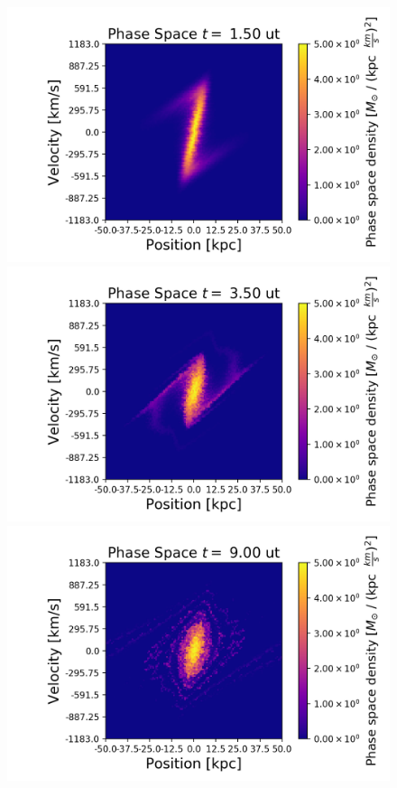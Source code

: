 {\begin{figure}[h!]
    \centering
    \includegraphics[scale=0.45]{imag/2dPhase3.png}
    \includegraphics[scale=0.45]{imag/2dPhase7.png}
    \includegraphics[scale=0.45]{imag/2dPhase18.png}

\end{figure}}
